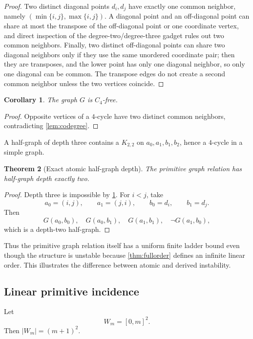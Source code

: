 \documentclass[11pt]{article}
\newtheorem{theorem}{Theorem}[section]
\newtheorem{corollary}[theorem]{Corollary}
\theoremstyle{definition}
\begin{document}
\begin{proof}
Two distinct diagonal points $d_i,d_j$ have exactly one common neighbor, namely $(\min\{i,j\},\max\{i,j\})$.  A diagonal point and an off-diagonal point can share at most the transpose of the off-diagonal point or one coordinate vertex, and direct inspection of the degree-two/degree-three gadget rules out two common neighbors.  Finally, two distinct off-diagonal points can share two diagonal neighbors only if they use the same unordered coordinate pair; then they are transposes, and the lower point has only one diagonal neighbor, so only one diagonal can be common.  The transpose edges do not create a second common neighbor unless the two vertices coincide.
\end{proof}

\begin{corollary}\label{cor:c4}
The graph $G$ is $C_4$-free.
\end{corollary}

\begin{proof}
Opposite vertices of a $4$-cycle have two distinct common neighbors, contradicting \cref{lem:codegree}.
\end{proof}

A half-graph of depth three contains a $K_{2,2}$ on $a_0,a_1,b_1,b_2$, hence a $4$-cycle in a simple graph.

\begin{theorem}[Exact atomic half-graph depth]\label{thm:ladder}
The primitive graph relation has half-graph depth exactly two.
\end{theorem}

\begin{proof}
Depth three is impossible by \cref{cor:c4}.  For $i<j$, take
\[
a_0=(i,j),\qquad a_1=(j,i),\qquad b_0=d_i,\qquad b_1=d_j.
\]
Then
\[
G(a_0,b_0),\quad G(a_0,b_1),\quad G(a_1,b_1),\quad \neg G(a_1,b_0),
\]
which is a depth-two half-graph.
\end{proof}

Thus the primitive graph relation itself has a uniform finite ladder bound even though the structure is unstable because \cref{thm:fullorder} defines an infinite linear order.  This illustrates the difference between atomic and derived instability.

\subsection{Linear primitive incidence}

Let
\[
W_m=[0,m]^2.
\]
Then $|W_m|=(m+1)^2$.
\end{document}
